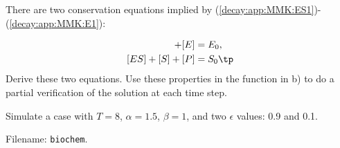 \documentclass[graybox,sectrefs,envcountresetchap,open=right,final]{svmonodo}
\newenvironment{doconceexercise}{}{}
\begin{document}
\begin{doconceexercise}

There are two conservation equations implied by
(\ref{decay:app:MMK:ES1})-(\ref{decay:app:MMK:E1}):

\begin{align}
[ES] + [E] &= E_0,\\ 
[ES] + [S] + [P] &= S_0\tp
\end{align}
Derive these two equations. Use these properties in the function
in b) to do a partial verification of the solution at each time step.



Simulate a case with $T=8$, $\alpha = 1.5$, $\beta=1$, and two
$\epsilon$ values: 0.9 and 0.1.



\noindent Filename: \texttt{biochem}.

\end{doconceexercise}
\end{document}
